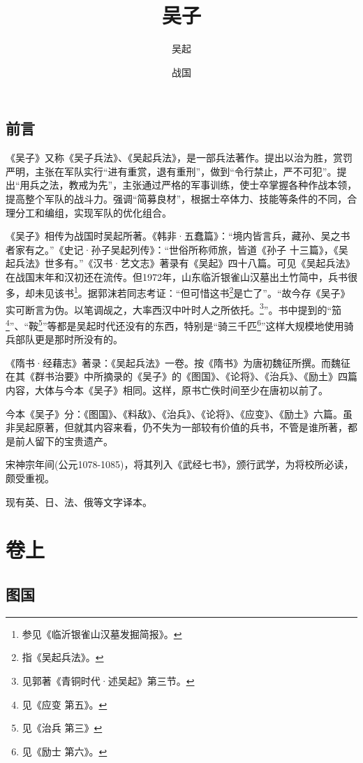 \documentclass[a4paper,12pt,UTF8,twoside]{ctexbook}
\title{\heiti\zihao{0} 吴子}
\author{吴起}
\date{战国}
\begin{document}
\maketitle
\tableofcontents

\frontmatter
\chapter{前言}

《吴子》又称《吴子兵法》、《吴起兵法》，是一部兵法著作。提出以治为胜，赏罚严明，主张在军队实行“进有重赏，退有重刑”，做到“令行禁止，严不可犯”。提出“用兵之法，教戒为先”，主张通过严格的军事训练，使士卒掌握各种作战本领，提高整个军队的战斗力。强调“简募良材”，根据士卒体力、技能等条件的不同，合理分工和编组，实现军队的优化组合。

《吴子》相传为战国时吴起所著。《韩非·五蠢篇》：“境内皆言兵，藏孙、吴之书者家有之。”《史记·孙子吴起列传》：“世俗所称师旅，皆道《孙子 十三篇》，《吴起兵法》世多有。”《汉书·艺文志》著录有《吴起》四十八篇。可见《吴起兵法》在战国末年和汉初还在流传。但1972年，山东临沂银雀山汉墓出土竹简中，兵书很多，却未见该书\footnote{参见《临沂银雀山汉墓发掘简报》。}。据郭沫若同志考证：“但可惜这书\footnote{指《吴起兵法》。}是亡了”。“故今存《吴子》实可断言为伪。以笔调觇之，大率西汉中叶时人之所依托。\footnote{见郭著《青铜时代·述吴起》第三节。}”。书中提到的“笳\footnote{见《应变 第五》。}”、“鞍\footnote{见《治兵 第三》}”等都是吴起时代还没有的东西，特别是“骑三千匹\footnote{见《励士 第六》。}”这样大规模地使用骑兵部队更是那时所没有的。

《隋书·经藉志》著录：《吴起兵法》一卷。按《隋书》为唐初魏征所撰。而魏征在其《群书治要》中所摘录的《吴子》的《图国》、《论将》、《治兵》、《励土》四篇内容，大体与今本《吴子》相同。这样，原书亡佚时间至少在唐初以前了。

今本《吴子》分：《图国》、《料敌》、《治兵》、《论将》、《应变》、《励土》六篇。虽非吴起原著，但就其内容来看，仍不失为一部较有价值的兵书，不管是谁所著，都是前人留下的宝贵遗产。

宋神宗年间(公元1078-1085)，将其列入《武经七书》，颁行武学，为将校所必读，颇受重视。

现有英、日、法、俄等文字译本。

\mainmatter

\part{卷上}

\chapter{图国}
\end{document}

